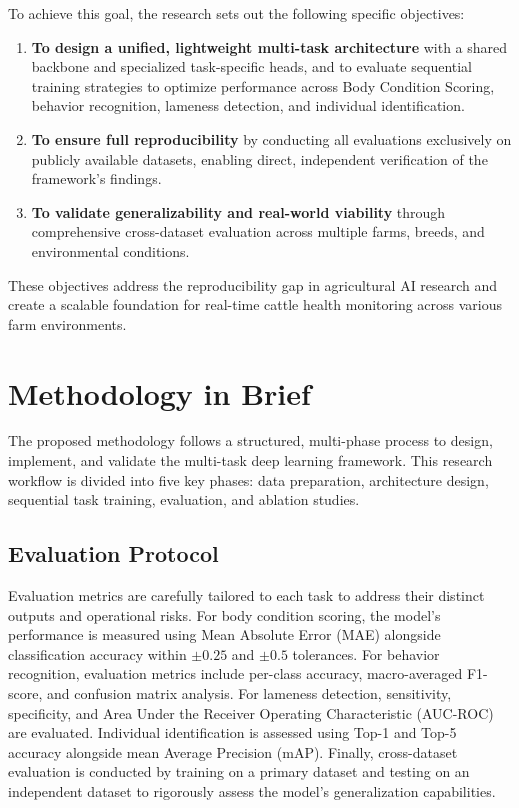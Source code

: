To achieve this goal, the research sets out the following specific objectives:

\begin{enumerate}
    \item \textbf{To design a unified, lightweight multi-task architecture} with a shared backbone and specialized task-specific heads, and to evaluate sequential training strategies to optimize performance across Body Condition Scoring, behavior recognition, lameness detection, and individual identification.
    
    \item \textbf{To ensure full reproducibility} by conducting all evaluations exclusively on publicly available datasets, enabling direct, independent verification of the framework's findings.
    
    \item \textbf{To validate generalizability and real-world viability} through comprehensive cross-dataset evaluation across multiple farms, breeds, and environmental conditions.
\end{enumerate}

These objectives address the reproducibility gap in agricultural AI research and create a scalable foundation for real-time cattle health monitoring across various farm environments.


\section{Methodology in Brief}

The proposed methodology follows a structured, multi-phase process to design, implement, and validate the multi-task deep learning framework. This research workflow is divided into five key phases: data preparation, architecture design, sequential task training, evaluation, and ablation studies.


\subsection{Evaluation Protocol}

Evaluation metrics are carefully tailored to each task to address their distinct outputs and operational risks. For body condition scoring, the model's performance is measured using Mean Absolute Error (MAE) alongside classification accuracy within $\pm0.25$ and $\pm0.5$ tolerances. For behavior recognition, evaluation metrics include per-class accuracy, macro-averaged F1-score, and confusion matrix analysis. For lameness detection, sensitivity, specificity, and Area Under the Receiver Operating Characteristic (AUC-ROC) are evaluated. Individual identification is assessed using Top-1 and Top-5 accuracy alongside mean Average Precision (mAP). Finally, cross-dataset evaluation is conducted by training on a primary dataset and testing on an independent dataset to rigorously assess the model's generalization capabilities.


